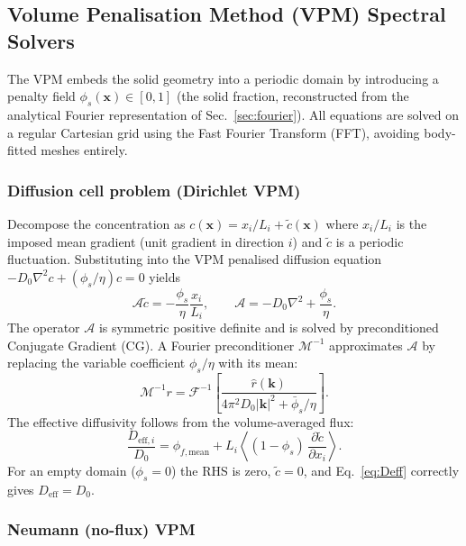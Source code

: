 \documentclass[preprint,12pt]{elsarticle}
\newcommand{\x}{\mathbf{x}}
\newcommand{\kvec}{\mathbf{k}}
\begin{document}
\subsection{Volume Penalisation Method (VPM) Spectral Solvers}
\label{sec:vpm}

The VPM embeds the solid geometry into a periodic domain by introducing a
penalty field $\phi_s(\x) \in [0,1]$ (the solid fraction, reconstructed from
the analytical Fourier representation of Sec.~\ref{sec:fourier}).  All
equations are solved on a regular Cartesian grid using the Fast Fourier
Transform (FFT), avoiding body-fitted meshes entirely.

\subsubsection*{Diffusion cell problem (Dirichlet VPM)}

Decompose the concentration as $c(\x) = x_i/L_i + \tilde{c}(\x)$ where
$x_i/L_i$ is the imposed mean gradient (unit gradient in direction $i$) and
$\tilde{c}$ is a periodic fluctuation. Substituting into the VPM penalised
diffusion equation $-D_0\nabla^2 c + (\phi_s/\eta)c = 0$ yields
\begin{equation}
  \mathcal{A}\tilde{c} = -\frac{\phi_s}{\eta}\frac{x_i}{L_i},
  \qquad
  \mathcal{A} = -D_0\nabla^2 + \frac{\phi_s}{\eta}.
\end{equation}
The operator $\mathcal{A}$ is symmetric positive definite and is solved by
preconditioned Conjugate Gradient (CG). A Fourier preconditioner
$\mathcal{M}^{-1}$ approximates $\mathcal{A}$ by replacing the variable
coefficient $\phi_s/\eta$ with its mean:
\begin{equation}
  \mathcal{M}^{-1} r = \mathcal{F}^{-1}\!\left[
    \frac{\hat{r}(\kvec)}{4\pi^2 D_0|\kvec|^2 + \bar{\phi}_s/\eta}
  \right].
\end{equation}
The effective diffusivity follows from the volume-averaged flux:
\begin{equation}
  \frac{D_{\text{eff},i}}{D_0}
  = \phi_{f,\text{mean}} + L_i \left\langle
      (1-\phi_s)\,\frac{\partial\tilde{c}}{\partial x_i}
    \right\rangle.
  \label{eq:Deff}
\end{equation}
For an empty domain ($\phi_s = 0$) the RHS is zero, $\tilde{c} = 0$, and
Eq.~\eqref{eq:Deff} correctly gives $D_{\text{eff}} = D_0$.

\subsubsection*{Neumann (no-flux) VPM}
\end{document}
